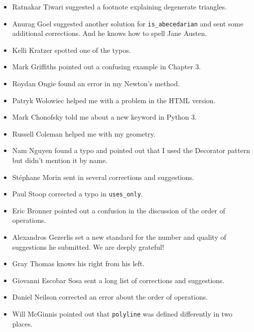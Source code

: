 \documentclass[10pt]{book}
\begin{document}
\begin{itemize}
\item Ratnakar Tiwari suggested a footnote explaining degenerate
triangles.

\item Anurag Goel suggested another solution for \verb"is_abecedarian"
and sent some additional corrections.  And he knows how to
spell Jane Austen.

\item Kelli Kratzer spotted one of the typos.

\item Mark Griffiths pointed out a confusing example in Chapter 3.

\item Roydan Ongie found an error in my Newton's method.

\item Patryk Wolowiec helped me with a problem in the HTML version.

\item Mark Chonofsky told me about a new keyword in Python 3.

\item Russell Coleman helped me with my geometry.

\item Nam Nguyen found a typo and pointed out that I used the Decorator
pattern but didn't mention it by name.

\item St\'{e}phane Morin sent in several corrections and suggestions.

\item Paul Stoop corrected a typo in \verb+uses_only+.

\item Eric Bronner pointed out a confusion in the discussion of the
order of operations.

\item Alexandros Gezerlis set a new standard for the number and
quality of suggestions he submitted.  We are deeply grateful!

\item Gray Thomas knows his right from his left.

\item Giovanni Escobar Sosa sent a long list of corrections and
suggestions.

\item Daniel Neilson corrected an error about the order of operations.

\item Will McGinnis pointed out that {\tt polyline} was defined
differently in two places.


\end{itemize}
\end{document}
